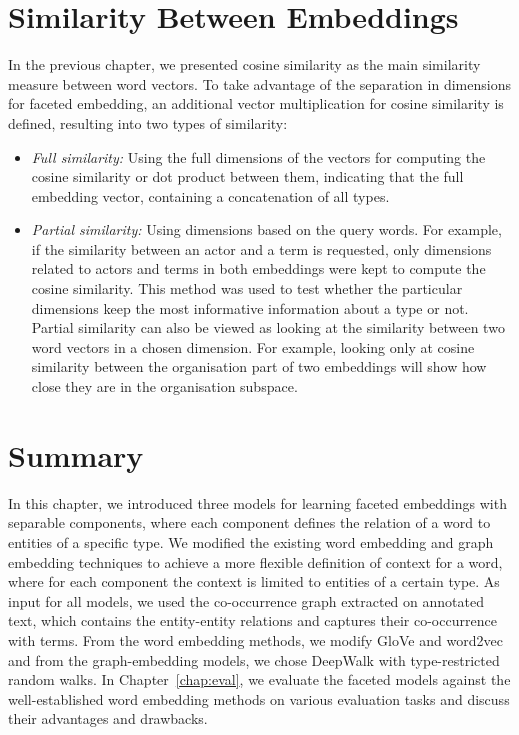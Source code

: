 \section{Similarity Between Embeddings}
In the previous chapter, we presented cosine similarity as the main similarity measure between word vectors. To take advantage of the separation in dimensions for faceted embedding, an additional vector multiplication for cosine similarity is defined, resulting into two types of similarity:  
\begin{itemize}
\item \emph{Full similarity:} Using the full dimensions of the vectors for computing the cosine similarity or dot product between them, indicating that the full embedding vector, containing a concatenation of all types. 
\item \emph{Partial similarity:} Using dimensions based on the query words. For example, if the similarity between an actor and a term is requested, only dimensions related to actors and terms in both embeddings were kept to compute the cosine similarity. This method was used to test whether the particular dimensions keep the most informative information about a type or not. Partial similarity can also be viewed as looking at the similarity between two word vectors in a chosen dimension. For example, looking only at cosine similarity between the organisation part of two embeddings will show how close they are in the organisation subspace. 
\end{itemize}


\section{Summary}\label{sec:faceted_summary}
In this chapter, we introduced three models for learning faceted embeddings with separable components, where each component defines the relation of a word to entities of a specific type. We modified the existing word embedding and graph embedding techniques to achieve a more flexible definition of context for a word, where for each component the context is limited to entities of a certain type. As input for all models, we used the co-occurrence graph extracted on annotated text, which contains the entity-entity relations and captures their co-occurrence with terms. From the word embedding methods, we modify GloVe and word2vec and from the graph-embedding models, we chose DeepWalk with type-restricted random walks. In Chapter~\ref{chap:eval}, we evaluate the faceted models against the well-established word embedding methods on various evaluation tasks and discuss their advantages and drawbacks.

